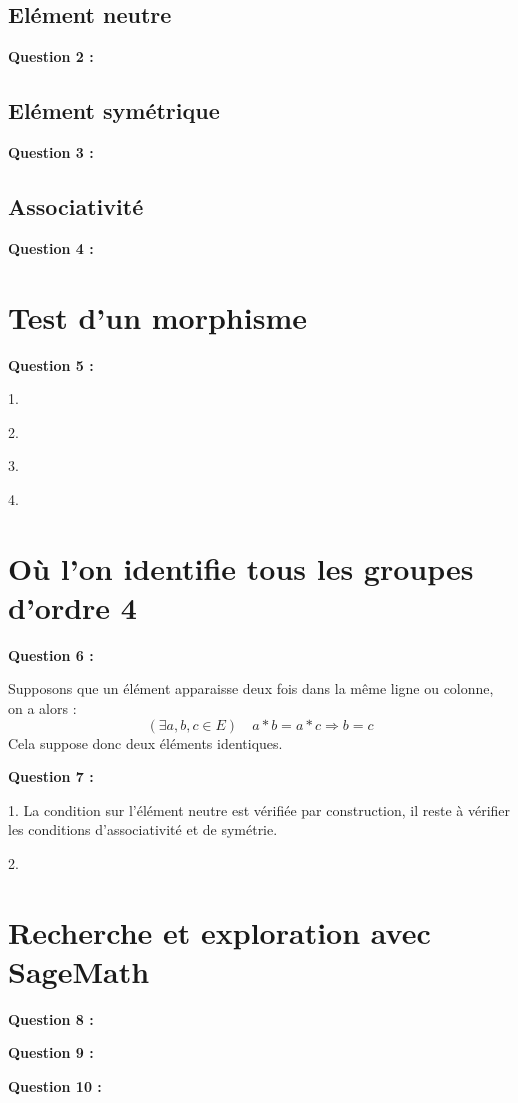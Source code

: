 \documentclass[titlepage]{article}
\begin{document}
        \subsection{Elément neutre}
        \textbf{Question 2 :}
        \subsection{Elément symétrique}
        \textbf{Question 3 :}
        \subsection{Associativité}
        \textbf{Question 4 :}
    \section{Test d'un morphisme}
    \textbf{Question 5 :}

    1.

    2.

    3.

    4.
    \section{Où l’on identifie tous les groupes d’ordre 4}
    \textbf{Question 6 :}

    Supposons que un élément apparaisse deux fois dans la même ligne ou colonne, on a alors :
    \[(\exists a, b, c \in E) \quad a*b=a*c \Longrightarrow b = c\]
    Cela suppose donc deux éléments identiques.

    \textbf{Question 7 :}

    1. La condition sur l'élément neutre est vérifiée par construction, il reste à vérifier les conditions d'associativité et de symétrie.

    2.
    \section{Recherche et exploration avec SageMath}
    \textbf{Question 8 :}

    \textbf{Question 9 :}

    \textbf{Question 10 :}
\end{document}
